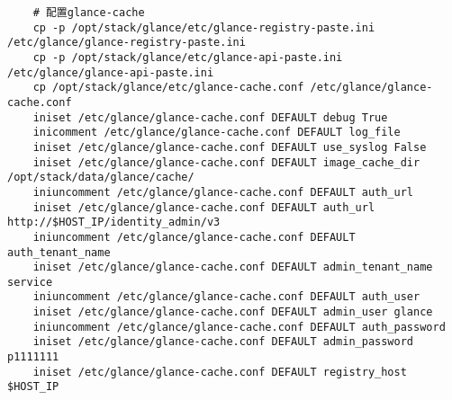 \documentclass[a4paper,left=1.5cm,right=1.5cm,11pt]{article}
\begin{document}
\begin{lstlisting}
	# 配置glance-cache
	cp -p /opt/stack/glance/etc/glance-registry-paste.ini /etc/glance/glance-registry-paste.ini
    cp -p /opt/stack/glance/etc/glance-api-paste.ini /etc/glance/glance-api-paste.ini
    cp /opt/stack/glance/etc/glance-cache.conf /etc/glance/glance-cache.conf
    iniset /etc/glance/glance-cache.conf DEFAULT debug True
    inicomment /etc/glance/glance-cache.conf DEFAULT log_file
    iniset /etc/glance/glance-cache.conf DEFAULT use_syslog False
    iniset /etc/glance/glance-cache.conf DEFAULT image_cache_dir /opt/stack/data/glance/cache/
    iniuncomment /etc/glance/glance-cache.conf DEFAULT auth_url
    iniset /etc/glance/glance-cache.conf DEFAULT auth_url http://$HOST_IP/identity_admin/v3
    iniuncomment /etc/glance/glance-cache.conf DEFAULT auth_tenant_name
    iniset /etc/glance/glance-cache.conf DEFAULT admin_tenant_name service
    iniuncomment /etc/glance/glance-cache.conf DEFAULT auth_user
    iniset /etc/glance/glance-cache.conf DEFAULT admin_user glance
    iniuncomment /etc/glance/glance-cache.conf DEFAULT auth_password
    iniset /etc/glance/glance-cache.conf DEFAULT admin_password p1111111
    iniset /etc/glance/glance-cache.conf DEFAULT registry_host $HOST_IP
	

\end{lstlisting}
\end{document}
